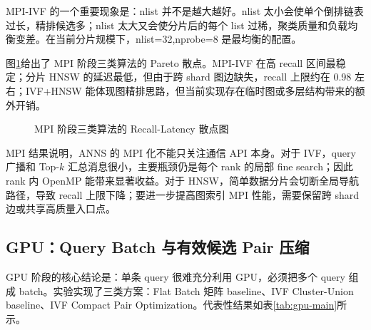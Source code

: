 \documentclass[a4paper]{article}
\begin{document}
MPI-IVF 的一个重要现象是：nlist 并不是越大越好。nlist 太小会使单个倒排链表过长，精排候选多；nlist 太大又会使分片后的每个 list 过稀，聚类质量和负载均衡变差。在当前分片规模下，nlist=32,nprobe=8 是最均衡的配置。

图\ref{fig:mpi-pareto}给出了 MPI 阶段三类算法的 Pareto 散点。MPI-IVF 在高 recall 区间最稳定；分片 HNSW 的延迟最低，但由于跨 shard 图边缺失，recall 上限约在 0.98 左右；IVF+HNSW 能体现图精排思路，但当前实现存在临时图或多层结构带来的额外开销。

\begin{figure}[H]
\centering
{}
\caption{MPI 阶段三类算法的 Recall-Latency 散点图}
\label{fig:mpi-pareto}
\end{figure}

MPI 结果说明，ANNS 的 MPI 化不能只关注通信 API 本身。对于 IVF，query 广播和 Top-$k$ 汇总消息很小，主要瓶颈仍是每个 rank 的局部 fine search；因此 rank 内 OpenMP 能带来显著收益。对于 HNSW，简单数据分片会切断全局导航路径，导致 recall 上限下降；要进一步提高图索引 MPI 性能，需要保留跨 shard 边或共享高质量入口点。

\subsection{GPU：Query Batch 与有效候选 Pair 压缩}

GPU 阶段的核心结论是：单条 query 很难充分利用 GPU，必须把多个 query 组成 batch。实验实现了三类方案：Flat Batch 矩阵 baseline、IVF Cluster-Union baseline、IVF Compact Pair Optimization。代表性结果如表\ref{tab:gpu-main}所示。
\end{document}
